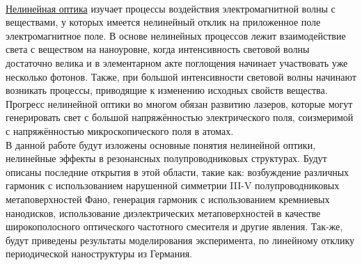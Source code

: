 \\
\hspace*{2mm}
\underline{Нелинейная оптика} изучает процессы воздействия электромагнитной волны с веществами, у которых имеется нелинейный отклик на приложенное поле электромагнитное поле. В основе нелинейных процессов лежит  взаимодействие света с веществом на наноуровне, когда интенсивность световой волны достаточно велика и в элементарном акте поглощения начинает участвовать уже несколько фотонов. Также, при большой интенсивности световой волны  начинают возникать процессы, приводящие к изменению исходных свойств вещества. Прогресс нелинейной оптики во многом обязан развитию лазеров, которые могут генерировать свет с большой напряжённостью электрического поля, соизмеримой с напряжённостью микроскопического поля в атомах.
\\
\hspace*{2mm}
В данной работе будут изложены основные понятия нелинейной оптики, нелинейные эффекты в резонансных полупроводниковых структурах. Будут описаны последние открытия в этой области, такие как: возбуждение различных гармоник с использованием нарушенной симметрии III-V полупроводниковых метаповерхностей Фано, генерация гармоник с использованием кремниевых нанодисков, использование диэлектрических метаповерхностей в качестве широкополосного оптического частотного смесителя и другие явления. Так-же, будут приведены результаты моделирования эксперимента, по линейному отклику периодической наноструктуры из Германия.

